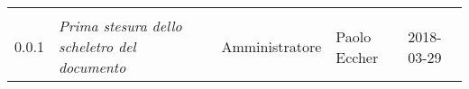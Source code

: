 \newpage 
\section*{}
\begin{table}[H]
	\centering
	\begin{tabular}{C{2cm}|C{4cm}|C{3cm}|C{3cm}|R{2cm}}
		
		 & & & & \\
		
		
		0.0.1 & \emph{Prima stesura dello scheletro del documento} & Amministratore & Paolo Eccher &  2018-03-29 \\
		
	\end{tabular}
	
\end{table}


\clearpage